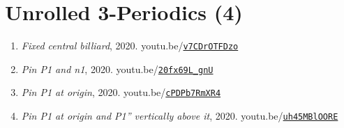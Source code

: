\documentclass[12pt]{article}
\begin{document}
\section{Unrolled 3-Periodics (4)}

\begin{enumerate}[resume]
\item \textit{Fixed central billiard}, 2020. youtu.be/\href{https://youtu.be/v7CDrOTFDzo}{\nolinkurl{v7CDrOTFDzo}}
\item \textit{Pin P1 and n1}, 2020. youtu.be/\href{https://youtu.be/20fx69L_gnU}{\nolinkurl{20fx69L\_gnU}}
\item \textit{Pin P1 at origin}, 2020. youtu.be/\href{https://youtu.be/cPDPb7RmXR4}{\nolinkurl{cPDPb7RmXR4}}
\item \textit{Pin P1 at origin and P1'' vertically above it}, 2020. youtu.be/\href{https://youtu.be/uh45MBlOORE}{\nolinkurl{uh45MBlOORE}}
\end{enumerate}
\end{document}
